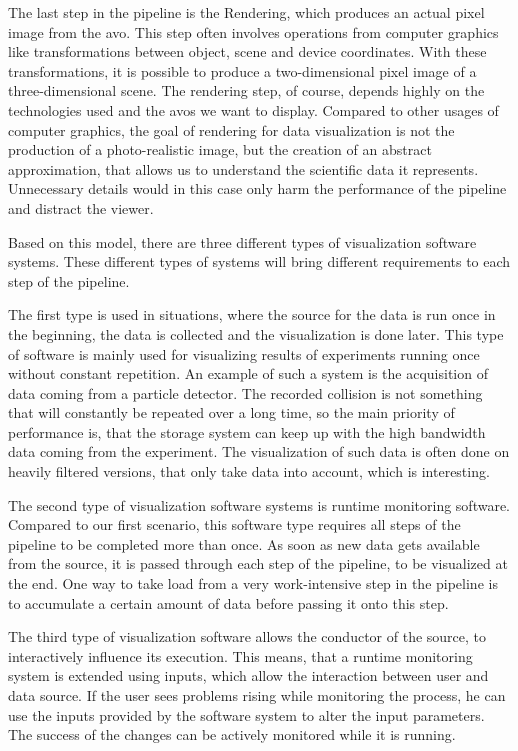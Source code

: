 The last step in the pipeline is the Rendering, which produces an actual pixel
image from the \gls{avo}. This step often involves operations from computer
graphics like transformations between object, scene and device coordinates. With
these transformations, it is possible to produce a two-dimensional pixel image of
a three-dimensional scene. The rendering step, of course, depends highly on the
technologies used and the \glspl{avo} we want to display. Compared to other
usages of computer graphics, the goal of rendering for data visualization is not
the production of a photo-realistic image, but the creation of an abstract
approximation, that allows us to understand the scientific data it represents.
Unnecessary details would in this case only harm the performance of the pipeline
and distract the viewer. 
\cite{VisIdioms, UnderstDataThroughVis}

Based on this model, there are three different types of visualization software
systems. These different types of systems will bring different requirements to
each step of the pipeline.

The first type is used in situations, where the source for the data is run once
in the beginning, the data is collected and the visualization is done later.
This type of software is mainly used for visualizing results of experiments
running once without constant repetition. An example of such a system is the
acquisition of data coming from a particle detector. The recorded collision is
not something that will constantly be repeated over a long time, so
the main priority of performance is, that the storage system can keep up with
the high bandwidth data coming from the experiment. The visualization of such
data is often done on heavily filtered versions, that only take data into
account, which is interesting.

The second type of visualization software systems is runtime monitoring
software. Compared to our first scenario, this software type requires all steps
of the pipeline to be completed more than once. As soon as new data gets
available from the source, it is passed through each step of the pipeline, to be
visualized at the end. One way to take load from a very work-intensive step in
the pipeline is to accumulate a certain amount of data before passing it onto
this step.

The third type of visualization software allows the conductor of the source, to
interactively influence its execution. This means, that a runtime monitoring
system is extended using inputs, which allow the interaction between user and
data source. If the user sees problems rising while monitoring the process, he
can use the inputs provided by the software system to alter the input
parameters. The success of the changes can be actively monitored while it is
running.
\cite{VisIdioms}

